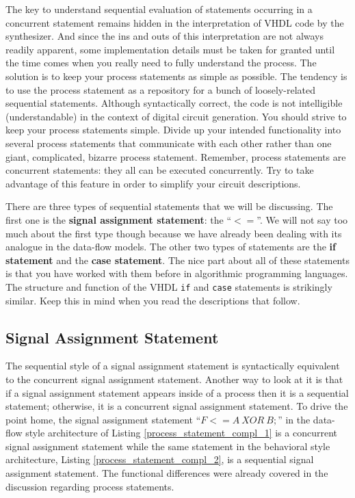 The key to understand sequential evaluation of statements occurring in a concurrent statement remains hidden in the interpretation of VHDL code by the synthesizer. And since the ins and outs of this interpretation are not always readily apparent, some implementation details must be taken for granted until the time comes when you really need to fully understand the process. The solution is to keep your process statements as simple as possible. The tendency is to use the process statement as a repository for a bunch of loosely-related sequential statements. Although syntactically correct, the code is not intelligible (understandable) in the context of digital circuit generation. You should strive to keep your process statements simple. Divide up your intended functionality into several process statements that communicate with each other rather than one giant, complicated, bizarre process statement. Remember, process statements are concurrent statements: they all can be executed concurrently. Try to take advantage of this feature in order to simplify your circuit descriptions.

There are three types of sequential statements that we will be discussing. The first one is the \textbf{signal assignment statement}: 
the ``{\footnotesize$<=$}''. We will not say too much about the first type though because we have already been dealing with its analogue in the data-flow models. The other two types of statements are the \textbf{if statement} and the \textbf{case statement}. The nice part about all of these statements is that you have worked with them before in algorithmic programming languages. The structure and function of the VHDL \texttt{if} and \texttt{case} statements is strikingly similar. Keep this in mind when you read the descriptions that follow.

\subsection{Signal Assignment Statement}
The sequential style of a signal assignment statement is syntactically equivalent to the concurrent signal assignment statement. Another way to look at it is that if a signal assignment statement appears inside of a process then it is a sequential statement; otherwise, it is a concurrent signal assignment statement. To drive the point home, the signal assignment statement ``{\footnotesize$F <= A~XOR~B;$}'' in the data-flow style architecture of Listing \ref{process_statement_compl_1} is a concurrent signal assignment statement while the same statement in the behavioral style architecture, Listing \ref{process_statement_compl_2}, is a sequential signal assignment statement. The functional differences were already covered in the discussion regarding process statements.

